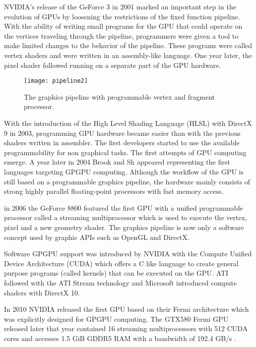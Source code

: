 NVIDIA's release of the GeForce 3 in 2001 marked an important step in the evolution of GPUs by loosening the restrictions of the fixed function pipeline. With the ability of writing small programs for the GPU that could operate on the vertices traveling through the pipeline, programmers were given a tool to make limited changes to the behavior of the pipeline. These programs were called vertex shaders and were written in an assembly-like language. One year later, the pixel shader followed running on a separate part of the GPU hardware.

\begin{figure} %
\centering
\texttt{[image: pipeline2]}
\caption{The graphics pipeline with programmable vertex and fragment processor.}
\label{fig:pipeline2}
\end{figure}

With the introduction of the High Level Shading Language (HLSL) with DirectX 9 in 2003, programming GPU hardware became easier than with the previous shaders written in assembler. The first developers started to use the available programmability for non graphical tasks. The first attempts of GPU computing emerge. A year later in 2004 Brook and Sh appeared representing the first languages targeting GPGPU computing.
Although the workflow of the GPU is still based on a programmable graphics pipeline, the hardware mainly consists of strong highly parallel floating-point processors with fast memory access.

in 2006 the GeForce 8800 featured the first GPU with a unified programmable processor called a streaming multiprocessor which is used to execute the vertex, pixel and a new geometry shader. The graphics pipeline is now only a software concept used by graphic APIs such as OpenGL and DirectX.

Software GPGPU support was introduced by NVIDIA with the Compute Unified Device Architecture (CUDA) which offers a C like language to create general purpose programs (called kernels) that can be executed on the GPU. ATI followed with the ATI Stream technology and Microsoft introduced compute shaders with DirectX 10.

In 2010 NVIDIA released the first GPU based on their Fermi architecture which was explicitly designed for GPGPU computing. The GTX580 Fermi GPU released later that year contained 16 streaming multiprocessors with 512 CUDA cores and accesses 1.5 GiB GDDR5 RAM with a bandwidth of 192.4 GB/s \cite{gtx580_spec}.

